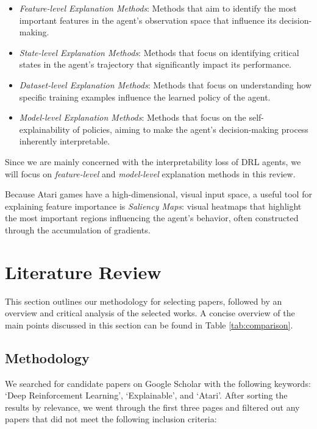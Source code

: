 \documentclass[sigconf]{acmart}
\begin{document}
\begin{itemize}
    \item \textit{Feature-level Explanation Methods}: Methods that aim to identify the most important features in the agent's observation space that influence its decision-making.
    \item \textit{State-level Explanation Methods}: Methods that focus on identifying critical states in the agent's trajectory that significantly impact its performance.
    \item \textit{Dataset-level Explanation Methods}: Methods that focus on understanding how specific training examples influence the learned policy of the agent.
    \item \textit{Model-level Explanation Methods}: Methods that focus on the self-explainability of policies, aiming to make the agent's decision-making process inherently interpretable.
\end{itemize}

Since we are mainly concerned with the interpretability loss of DRL agents, we will focus on \textit{feature-level} and \textit{model-level} explanation methods in this review.

Because Atari games have a high-dimensional, visual input space, a useful tool for explaining feature importance is \textit{Saliency Maps}: visual heatmaps that highlight the most important regions influencing the agent's behavior, often constructed through the accumulation of gradients\cite{simonyan2013deep}.

%
%
\section{Literature Review} \label{sec:papers}
This section outlines our methodology for selecting papers, followed by an overview and critical analysis of the selected works.
A concise overview of the main points discussed in this section can be found in Table \ref{tab:comparison}.

\subsection{Methodology}
We searched for candidate papers on Google Scholar with the following keywords: `Deep Reinforcement Learning', `Explainable', and `Atari'.
After sorting the results by relevance, we went through the first three pages and filtered out any papers that did not meet the following inclusion criteria:
\end{document}
